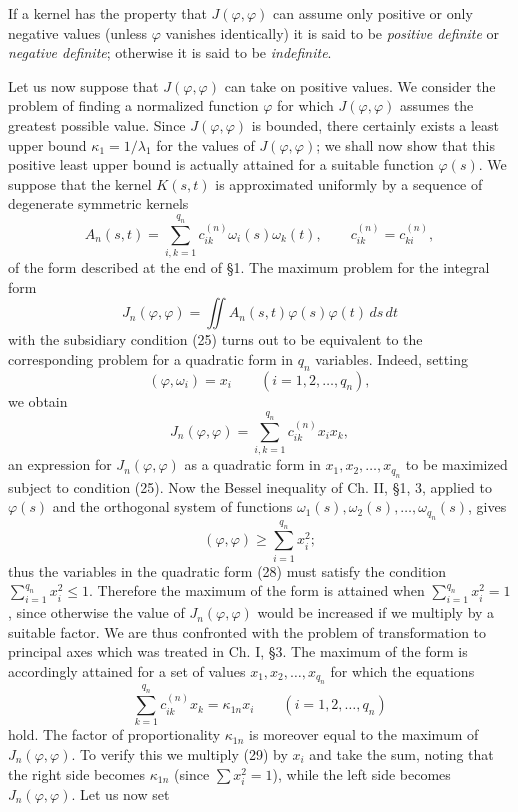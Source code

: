 If a kernel has the property that $J(\varphi,\varphi)$ can assume only positive or only negative values (unless $\varphi$ vanishes identically) it is said to be \emph{positive definite} or \emph{negative definite}; otherwise it is said to be \emph{indefinite}.

Let us now suppose that $J(\varphi,\varphi)$ can take on positive values. We consider the problem of finding a normalized function $\varphi$ for which $J(\varphi,\varphi)$ assumes the greatest possible value. Since $J(\varphi,\varphi)$ is bounded, there certainly exists a least upper bound $\kappa_1=1/\lambda_1$ for the values of $J(\varphi,\varphi)$; we shall now show that this positive least upper bound is actually attained for a suitable function $\varphi(s)$. We suppose that the kernel $K(s,t)$ is approximated uniformly by a sequence of degenerate symmetric kernels
\[
A_n(s,t)=\sum_{i,k=1}^{q_n}c_{ik}^{(n)}\omega_i(s)\omega_k(t),
\qquad c_{ik}^{(n)}=c_{ki}^{(n)},
\]
of the form described at the end of \S1. The maximum problem for the integral form
\[
J_n(\varphi,\varphi)=\iint A_n(s,t)\varphi(s)\varphi(t)\,ds\,dt
\]
with the subsidiary condition (25) turns out to be equivalent to the corresponding problem for a quadratic form in $q_n$ variables. Indeed, setting
\[
(\varphi,\omega_i)=x_i \qquad (i=1,2,\ldots,q_n),
\]
we obtain
\begin{equation}\tag{28}
J_n(\varphi,\varphi)=\sum_{i,k=1}^{q_n}c_{ik}^{(n)}x_i x_k,
\end{equation}
an expression for $J_n(\varphi,\varphi)$ as a quadratic form in $x_1,x_2,\ldots,x_{q_n}$ to be maximized subject to condition (25). Now the Bessel inequality of Ch. II, \S1, 3, applied to $\varphi(s)$ and the orthogonal system of functions $\omega_1(s),\omega_2(s),\ldots,\omega_{q_n}(s)$, gives
\[
(\varphi,\varphi)\ge\sum_{i=1}^{q_n}x_i^2;
\]
thus the variables in the quadratic form (28) must satisfy the condition $\sum_{i=1}^{q_n}x_i^2\le1$. Therefore the maximum of the form is attained when $\sum_{i=1}^{q_n}x_i^2=1$, since otherwise the value of $J_n(\varphi,\varphi)$ would be increased if we multiply by a suitable factor. We are thus confronted with the problem of transformation to principal axes which was treated in Ch. I, \S3. The maximum of the form is accordingly attained for a set of values $x_1,x_2,\ldots,x_{q_n}$ for which the equations
\begin{equation}\tag{29}
\sum_{k=1}^{q_n}c_{ik}^{(n)}x_k=\kappa_{1n}x_i
\qquad (i=1,2,\ldots,q_n)
\end{equation}
hold. The factor of proportionality $\kappa_{1n}$ is moreover equal to the maximum of $J_n(\varphi,\varphi)$. To verify this we multiply (29) by $x_i$ and take the sum, noting that the right side becomes $\kappa_{1n}$ (since $\sum x_i^2=1$), while the left side becomes $J_n(\varphi,\varphi)$. Let us now set
